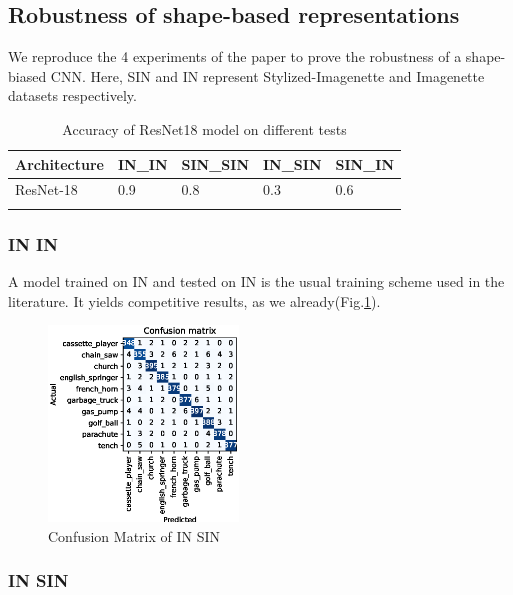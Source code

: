 \documentclass{article}
\begin{document}
\subsection{Robustness of shape-based representations}

We reproduce the 4 experiments of the paper to prove the robustness of a shape-biased CNN.
Here, SIN and IN represent Stylized-Imagenette and Imagenette datasets respectively.

\begin{table}[h!]
  \begin{tabular}{lllll}
  \Xhline{2\arrayrulewidth}
  Architecture & IN\_IN & SIN\_SIN & IN\_SIN & SIN\_IN \\ \hline
  ResNet-18    & 0.9    & 0.8      & 0.3     & 0.6     \\ \Xhline{2\arrayrulewidth}
  \end{tabular}
  \caption{Accuracy of ResNet18 model on different tests}

\end{table}


\subsubsection{IN \texorpdfstring{\textrightarrow} .IN}
A model trained on IN and tested on IN is the usual training scheme used in the literature.
It yields competitive results, as we already(Fig.\ref{fig:cm_in-in}).

\begin{figure}[h!]
  \includegraphics[width = 0.45\textwidth]{imgs/in/in-in/in-in_confusion_matrix_0.963.eps}
  \caption{Confusion Matrix of IN \texorpdfstring{\textrightarrow} .SIN}
  \label{fig:cm_in-in}
\end{figure}

\subsubsection{IN \texorpdfstring{\textrightarrow} .SIN}
\end{document}
